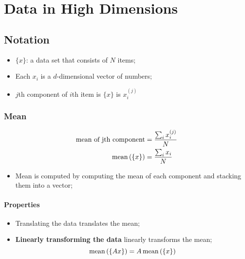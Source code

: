 \chapter{Data in High Dimensions}

\section{Notation}

  \begin{itemize}
    \item $ \{ x \} $: a data set that consists of $ N $ items;
    \item Each $ x_{i} $ is a $ d $-dimensional vector of numbers;
    \item $ j $th component of $ i $th item is $ \{ x \} $ is $ x_{i}^{\left( j \right)} $
  \end{itemize}
  
  \subsection{Mean}
  
    \begin{align}
      \text{\rmfamily mean of jth component} &= \frac{ \sum_{i} x_{i}^{(j)} }{ N } \\
      \operatorname{mean}\left( \{ x \} \right) &=  \frac{ \sum_{i} x_{i} }{ N }
    \end{align}
  
    \begin{itemize}
      \item Mean is computed by computing the mean of each component and stacking them into a vector;
    \end{itemize} 
    
    \subsubsection{Properties}
    
      \begin{itemize}
        \item Translating the data translates the mean;
        \item \textbf{Linearly transforming the data} linearly transforms the mean;
        \begin{equation}
          \operatorname{mean}\left( \{ A x \} \right) = A \operatorname{mean}\left( \{ x \} \right)
        \end{equation}
      \end{itemize}

